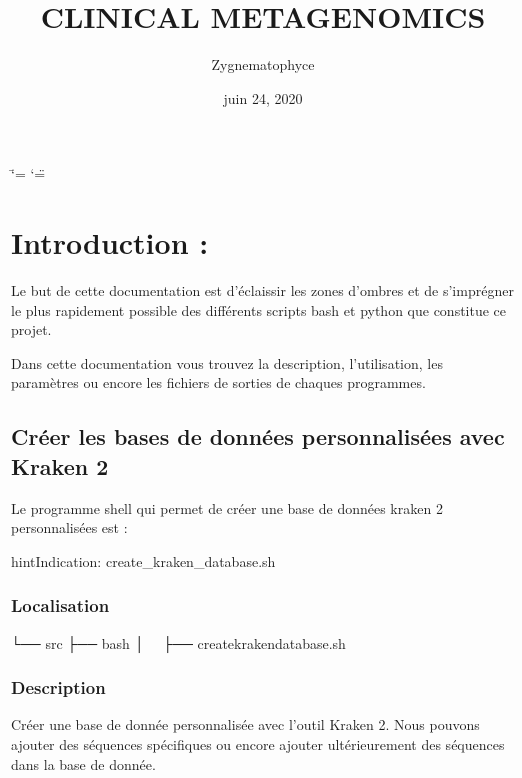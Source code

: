 \documentclass[letterpaper,10pt,french]{sphinxmanual}
\title{CLINICAL METAGENOMICS}
\date{juin 24, 2020}
\author{Zygnematophyce}
\begin{document}
\ifdefined\shorthandoff
  \ifnum\catcode`\=\string=\active\shorthandoff{=}\fi
  \ifnum\catcode`\"=\active{}\fi
\fi

\pagestyle{empty}
\sphinxmaketitle
\pagestyle{plain}
\sphinxtableofcontents
\pagestyle{normal}
\label{\detokenize{index::doc}}



\chapter{Introduction :}
\label{\detokenize{index:introduction}}
Le but de cette documentation est d’éclaissir les zones d’ombres et de s’imprégner le plus rapidement possible des différents scripts bash et python que constitue ce projet.

Dans cette documentation vous trouvez la description, l’utilisation, les paramètres ou encore les fichiers de sorties de chaques programmes.


\section{Créer les bases de données personnalisées avec Kraken 2}
\label{\detokenize{bash/create_kraken_database.sh:creer-les-bases-de-donnees-personnalisees-avec-kraken-2}}\label{\detokenize{bash/create_kraken_database.sh::doc}}
Le programme shell qui permet de créer une base de données kraken 2 personnalisées est :

\begin{sphinxadmonition}{hint}{Indication:}
create\_kraken\_database.sh
\end{sphinxadmonition}


\subsection{Localisation}
\label{\detokenize{bash/create_kraken_database.sh:localisation}}
\begin{sphinxVerbatim}[commandchars=\\\{\}]
└── src
 ├── bash
 │   ├── create\PYGZus{}kraken\PYGZus{}database.sh
\end{sphinxVerbatim}


\subsection{Description}
\label{\detokenize{bash/create_kraken_database.sh:description}}
Créer une base de donnée personnalisée avec l’outil Kraken 2. Nous pouvons ajouter des séquences spécifiques ou encore ajouter ultérieurement des séquences dans la base de donnée.
\end{document}
